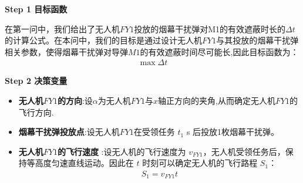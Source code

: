 \documentclass[../main.tex]{subfiles}
\begin{document}
\noindent \textbf{Step 1 目标函数}
\par 在第一问中，我们给出了无人机$FY1$投放的烟幕干扰弹对M1的有效遮蔽时长的$\Delta t$ 的计算公式。在本问中，我们的目标是通过设计无人机$FY1$与其投放的烟幕干扰弹相关参数，使得烟幕干扰弹对导弹$M1$的有效遮蔽时间尽可能长,因此目标函数为：
\begin{align}\label{10.1}
  \max \Delta t
\end{align}



\noindent \textbf{Step 2 决策变量}

\begin{itemize}
\item \textbf{无人机$FY1$的方向}:设$\alpha $为无人机$FY1$与$x$轴正方向的夹角,从而确定无人机$FY1$的飞行方向.
\item \textbf{烟幕干扰弹投放点}:设无人机$FY1$在受领任务 \( t_1 \) s 后投放1枚烟幕干扰弹。
\item  \textbf{无人机$FY1$的飞行速度} :设无人机的飞行速度为 \( v_{FY1} \)，无人机受领任务后，保持等高度匀速直线运动。因此在 \( t \) 时刻可以确定无人机的飞行路程 \( S_1 \)：
\begin{align}\label{10.2}
  S_1 = v_{FY1} t
\end{align}


\end{itemize}
\end{document}

